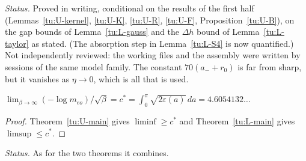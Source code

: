 \noindent\emph{Status.} Proved in writing, conditional on the results of the first half (Lemmas~\ref{tu:U-kernel},
\ref{tu:U-K}, \ref{tu:U-R}, \ref{tu:U-F}, Proposition~\ref{tu:U-B}), on the gap bounds of Lemma~\ref{tu:L-gauss} and the $\Delta h$
bound of Lemma~\ref{tu:L-taylor} as stated. (The absorption step in Lemma~\ref{tu:L-S4} is now quantified.) Not independently
reviewed: the working files and the assembly were written by sessions of the same model family. The constant $70(a_-+r_0)$ is far
from sharp, but it vanishes as $\eta\to0$, which is all that is used.

\begin{corollary}\label{tu:L-limit}
$\lim_{\beta\to\infty}(-\log m_{eo})/\sqrt\beta=c^*=\int_0^\pi\sqrt{2\varepsilon(a)}\,da=4.6054132\ldots$
\end{corollary}

\begin{proof}
Theorem~\ref{tu:U-main} gives $\liminf\ge c^*$ and Theorem~\ref{tu:L-main} gives $\limsup\le c^*$.
\end{proof}

\noindent\emph{Status.} As for the two theorems it combines.
